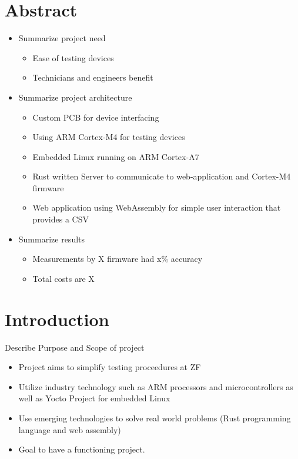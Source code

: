 \documentclass[12pt]{article}
\begin{document}
\section{Abstract}
\begin{itemize}
  \item Summarize project need
    \begin{itemize}
      \item Ease of testing devices
      \item Technicians and engineers benefit 
    \end{itemize}
  \item Summarize project architecture 
    \begin{itemize}
      \item Custom PCB for device interfacing
      \item Using ARM Cortex-M4 for testing devices
      \item Embedded Linux running on ARM Cortex-A7
      \item Rust written Server to communicate to web-application and Cortex-M4 firmware
      \item Web application using WebAssembly for simple user interaction that provides a CSV
    \end{itemize}
  \item Summarize results 
    \begin{itemize}
      \item Measurements by X firmware had x\% accuracy 
      \item Total costs are X
    \end{itemize}
\end{itemize}

\section{Introduction}
Describe Purpose and Scope of project

\begin{itemize}
  \item Project aims to simplify testing proceedures at ZF
  \item Utilize industry technology such as ARM processors and microcontrollers
    as well as Yocto Project for embedded Linux
  \item Use emerging technologies to solve real world problems (Rust programming 
    language and web assembly)
  \item Goal to have a functioning project.
\end{itemize}
\end{document}
